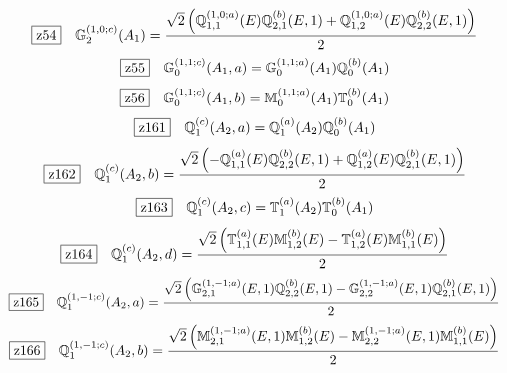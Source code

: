 \documentclass[fleqn,10pt,landscape]{jsarticle}
\begin{document}
\begin{dmath*}
\hspace*{3mm}\fbox{z54}\quad \mathbb{G}_{2}^{(1,0;c)}(A_{1})=\frac{\sqrt{2} \left(\mathbb{Q}_{1,1}^{(1,0;a)}(E) \mathbb{Q}_{2,1}^{(b)}(E,1) + \mathbb{Q}_{1,2}^{(1,0;a)}(E) \mathbb{Q}_{2,2}^{(b)}(E,1)\right)}{2}
\end{dmath*}
\begin{dmath*}
\hspace*{3mm}\fbox{z55}\quad \mathbb{G}_{0}^{(1,1;c)}(A_{1},a)=\mathbb{G}_{0}^{(1,1;a)}(A_{1}) \mathbb{Q}_{0}^{(b)}(A_{1})
\end{dmath*}
\begin{dmath*}
\hspace*{3mm}\fbox{z56}\quad \mathbb{G}_{0}^{(1,1;c)}(A_{1},b)=\mathbb{M}_{0}^{(1,1;a)}(A_{1}) \mathbb{T}_{0}^{(b)}(A_{1})
\end{dmath*}
\begin{dmath*}
\hspace*{3mm}\fbox{z161}\quad \mathbb{Q}_{1}^{(c)}(A_{2},a)=\mathbb{Q}_{1}^{(a)}(A_{2}) \mathbb{Q}_{0}^{(b)}(A_{1})
\end{dmath*}
\begin{dmath*}
\hspace*{3mm}\fbox{z162}\quad \mathbb{Q}_{1}^{(c)}(A_{2},b)=\frac{\sqrt{2} \left(- \mathbb{Q}_{1,1}^{(a)}(E) \mathbb{Q}_{2,2}^{(b)}(E,1) + \mathbb{Q}_{1,2}^{(a)}(E) \mathbb{Q}_{2,1}^{(b)}(E,1)\right)}{2}
\end{dmath*}
\begin{dmath*}
\hspace*{3mm}\fbox{z163}\quad \mathbb{Q}_{1}^{(c)}(A_{2},c)=\mathbb{T}_{1}^{(a)}(A_{2}) \mathbb{T}_{0}^{(b)}(A_{1})
\end{dmath*}
\begin{dmath*}
\hspace*{3mm}\fbox{z164}\quad \mathbb{Q}_{1}^{(c)}(A_{2},d)=\frac{\sqrt{2} \left(\mathbb{T}_{1,1}^{(a)}(E) \mathbb{M}_{1,2}^{(b)}(E) - \mathbb{T}_{1,2}^{(a)}(E) \mathbb{M}_{1,1}^{(b)}(E)\right)}{2}
\end{dmath*}
\begin{dmath*}
\hspace*{3mm}\fbox{z165}\quad \mathbb{Q}_{1}^{(1,-1;c)}(A_{2},a)=\frac{\sqrt{2} \left(\mathbb{G}_{2,1}^{(1,-1;a)}(E,1) \mathbb{Q}_{2,2}^{(b)}(E,1) - \mathbb{G}_{2,2}^{(1,-1;a)}(E,1) \mathbb{Q}_{2,1}^{(b)}(E,1)\right)}{2}
\end{dmath*}
\begin{dmath*}
\hspace*{3mm}\fbox{z166}\quad \mathbb{Q}_{1}^{(1,-1;c)}(A_{2},b)=\frac{\sqrt{2} \left(\mathbb{M}_{2,1}^{(1,-1;a)}(E,1) \mathbb{M}_{1,2}^{(b)}(E) - \mathbb{M}_{2,2}^{(1,-1;a)}(E,1) \mathbb{M}_{1,1}^{(b)}(E)\right)}{2}
\end{dmath*}
\end{document}
